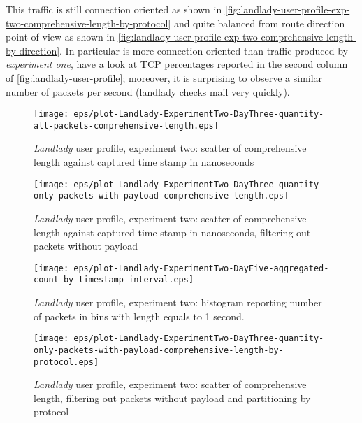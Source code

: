 \documentclass[10pt,a4paper]{article}
\begin{document}
    This traffic is still connection oriented as shown in
    \autoref{fig:landlady-user-profile-exp-two-comprehensive-length-by-protocol}
    and quite balanced from route direction point of view as shown in
    \autoref{fig:landlady-user-profile-exp-two-comprehensive-length-by-direction}. In
    particular is more connection oriented than traffic produced by
    \emph{experiment one}, have a look at TCP percentages reported in
    the second column of \autoref{fig:landlady-user-profile};
    moreover, it is surprising to observe a similar number of packets
    per second (landlady checks mail very quickly).

    \begin{figure}
      \centering
      \texttt{[image: eps/plot-Landlady-ExperimentTwo-DayThree-quantity-all-packets-comprehensive-length.eps]}
      \caption{\emph{Landlady} user profile, experiment two: scatter
        of comprehensive length against captured time stamp in
        nanoseconds}
      \label{fig:landlady-user-profile-exp-two-comprehensive-length-scatter}
    \end{figure}

    \begin{figure}
      \centering
      \texttt{[image: eps/plot-Landlady-ExperimentTwo-DayThree-quantity-only-packets-with-payload-comprehensive-length.eps]}
      \caption{\emph{Landlady} user profile, experiment two: scatter
        of comprehensive length against captured time stamp in
        nanoseconds, filtering out packets without payload}
      \label{fig:landlady-user-profile-exp-two-comprehensive-length-scatter-filtering-on-payload}
    \end{figure}
    
    \begin{figure}
      \centering
      \texttt{[image: eps/plot-Landlady-ExperimentTwo-DayFive-aggregated-count-by-timestamp-interval.eps]}
      \caption{\emph{Landlady} user profile, experiment two: histogram
        reporting number of packets in bins with length equals to 1
        second.}
      \label{fig:landlady-user-profile-exp-two-count-histogram}
    \end{figure}

    \begin{figure}
      \centering
      \texttt{[image: eps/plot-Landlady-ExperimentTwo-DayThree-quantity-only-packets-with-payload-comprehensive-length-by-protocol.eps]}
      \caption{\emph{Landlady} user profile, experiment two: scatter
        of comprehensive length, filtering out packets without payload
        and partitioning by protocol}
      \label{fig:landlady-user-profile-exp-two-comprehensive-length-by-protocol}
    \end{figure}
\end{document}
